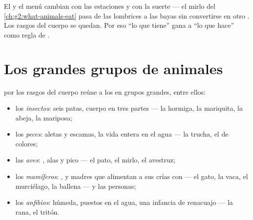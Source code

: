\begin{remark}\label{rem:g3:sorting-living-things:why}
El  y el menú cambian con las estaciones y con la suerte --- el
mirlo del \cref{ch:g2:what-animals-eat} pasa de las lombrices a las
bayas sin convertirse en otro . Los rasgos del cuerpo se quedan.
Por eso ``lo que tiene'' gana a ``lo que hace'' como regla de
.
\end{remark}

\section{Los grandes grupos de animales}

\begin{proposition}\label{prop:g3:sorting-living-things:groups}
 por los rasgos del cuerpo reúne a los  en grupos
grandes, entre ellos:
\begin{itemize}
  \item los \emph{insectos}: seis patas, cuerpo en tres
        partes --- la hormiga, la mariquita, la abeja, la mariposa;
  \item los \emph{peces}: aletas y escamas, la vida entera
        en el agua --- la trucha, el  de colores;
  \item las \emph{aves}: , alas y pico --- el pato,
        el mirlo, el avestruz;
  \item los \emph{mamíferos}: , y madres que
        alimentan a sus crías con  --- el gato, la vaca, el
        murciélago, la ballena --- y las personas;
  \item los \emph{anfibios}:  húmeda, 
        puestos en el agua, una infancia de renacuajo --- la rana, el tritón.
\end{itemize}
\end{proposition}
\admitted

